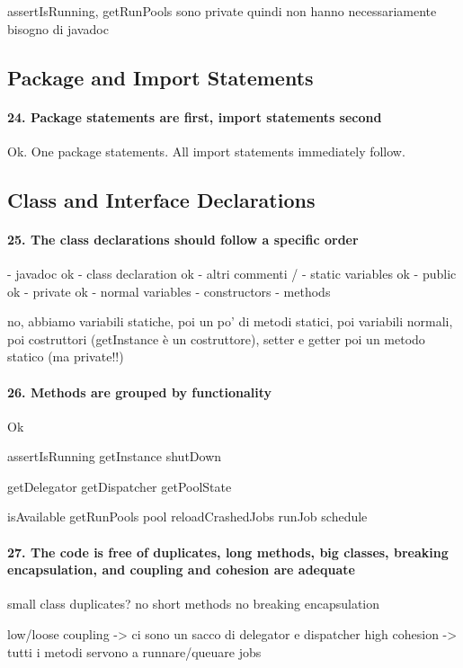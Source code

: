 \documentclass[english]{article}
\begin{document}
assertIsRunning, getRunPools sono private quindi non hanno necessariamente bisogno di javadoc

\subsection{Package and Import Statements}
\paragraph{24. Package statements are first, import statements second}
Ok.
One package statements.
All import statements immediately follow.

\subsection{Class and Interface Declarations}
\paragraph{25. The class declarations should follow a specific order}
- javadoc ok
- class declaration ok
- altri commenti /
- static variables ok
 - public ok
 - private ok
- normal variables 
- constructors
- methods

no, abbiamo variabili statiche, poi un po' di metodi statici, poi variabili normali, poi costruttori (getInstance è un costruttore), setter e getter poi un metodo statico (ma private!!)


\paragraph{26. Methods are grouped by functionality}
Ok

assertIsRunning
getInstance
shutDown

getDelegator
getDispatcher
getPoolState

isAvailable
getRunPools
pool
reloadCrashedJobs
runJob
schedule

\paragraph{27. The code is free of duplicates, long methods, big classes, breaking encapsulation, and coupling and cohesion are adequate}
small class
duplicates? no
short methods
no breaking encapsulation

low/loose coupling -> ci sono un sacco di delegator e dispatcher
high cohesion -> tutti i metodi servono a runnare/queuare jobs
\end{document}

